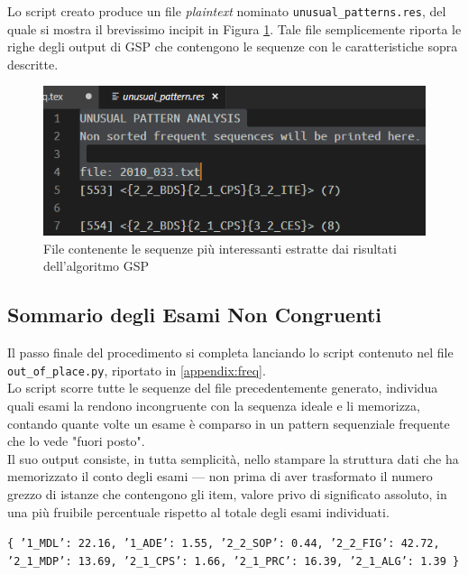    Lo script creato produce un file \textit{plaintext} nominato \texttt{unusual\_patterns.res}, del quale si mostra il brevissimo incipit in Figura \ref{file_unusual}. Tale file semplicemente riporta le righe degli output di GSP che contengono le sequenze con le caratteristiche sopra descritte.

    \begin{figure}
        \centering
        \caption{File contenente le sequenze più interessanti estratte dai risultati dell'algoritmo GSP}
        \label{file_unusual}
        \includegraphics[scale=0.60]{img/unusual_pattern.png}
    \end{figure}

    \subsection{Sommario degli Esami Non Congruenti}

    Il passo finale del procedimento si completa lanciando lo script contenuto nel file \texttt{out\_of\_place.py}, riportato in \ref{appendix:freq}.\\

    Lo script scorre tutte le sequenze del file precedentemente generato, individua quali esami la rendono incongruente con la sequenza ideale e li memorizza, contando quante volte un esame è comparso in un pattern sequenziale frequente che lo vede "fuori posto". \\

    Il suo output consiste, in tutta semplicità, nello stampare la struttura dati che ha memorizzato il conto degli esami --- non prima di aver trasformato il numero grezzo di istanze che contengono gli item, valore privo di significato assoluto, in una più fruibile percentuale rispetto al totale degli esami individuati. \\

    \begin{centering}
        \texttt{\{ '1\_MDL': 22.16, '1\_ADE': 1.55, '2\_2\_SOP': 0.44, '2\_2\_FIG': 42.72, '2\_1\_MDP': 13.69, '2\_1\_CPS': 1.66, '2\_1\_PRC': 16.39, '2\_1\_ALG': 1.39 \}}
    \end{centering}


